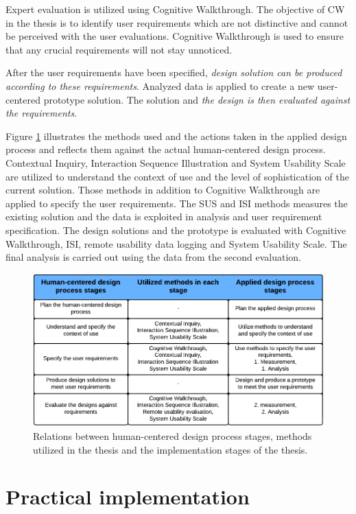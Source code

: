 \documentclass[12pt,a4paper,oneside,pdftex]{report}
\begin{document}
Expert evaluation is utilized using Cognitive Walkthrough. The objective of CW in the thesis is to identify user requirements which are not distinctive and cannot be perceived with the user evaluations. Cognitive Walkthrough is used to ensure that any crucial requirements will not stay unnoticed.

After the user requirements have been specified, \emph{design solution can be produced according to these requirements}. Analyzed data is applied to create a new user-centered prototype solution. The solution and \emph{the design is then evaluated against the requirements}. 

Figure \ref{fig:hcd_process} illustrates the methods used and the actions taken in the applied design process and reflects them against the actual human-centered design process. Contextual Inquiry, Interaction Sequence Illustration and System Usability Scale are utilized to understand the context of use and the level of sophistication of the current solution. Those methods in addition to Cognitive Walkthrough are applied to specify the user requirements. The SUS and ISI methods measures the existing solution and the data is exploited in analysis and user requirement specification. The design solutions and the prototype is evaluated with Cognitive Walkthrough, ISI, remote usability data logging and System Usability Scale. The final analysis is carried out using the data from the second evaluation.  


\begin{figure}[H]
  	\centering
    	\includegraphics[width=1.0\textwidth]{./images/applied_hcd_process.png}
  	\caption{Relations between human-centered design process stages, methods utilized in the thesis and the implementation stages of the thesis.}
	\label{fig:hcd_process}
\end{figure}


    \section{Practical implementation}
    \label{sec:implementation}
    
\end{document}
